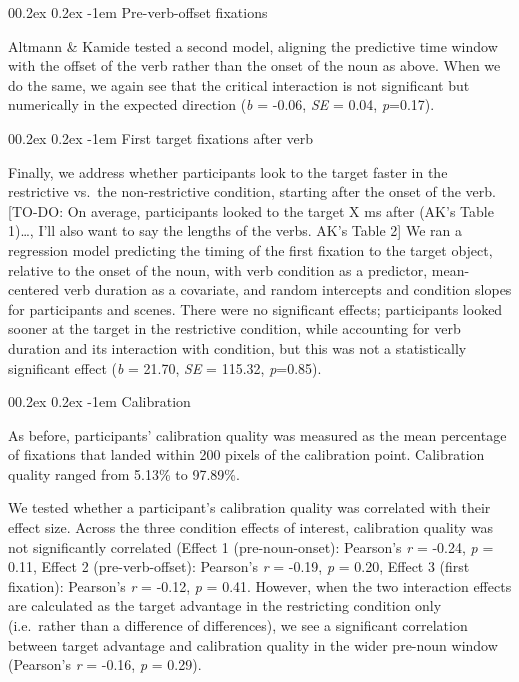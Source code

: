 \documentclass[
  man,floatsintext]{apa6}
\makeatletter
\let\oldparagraph\paragraph
\renewcommand{\paragraph}[1]{\oldparagraph{#1}\mbox{}}
\renewcommand{\paragraph}{\@startsection{paragraph}{4}{\parindent}%
  {0\baselineskip \@plus 0.2ex \@minus 0.2ex}%
  {-1em}%
  {\normalfont\normalsize\bfseries\itshape\typesectitle}}
\makeatother
\begin{document}
\hypertarget{pre-verb-offset-fixations-1}{%
\paragraph{Pre-verb-offset fixations}\label{pre-verb-offset-fixations-1}}

Altmann \& Kamide tested a second model, aligning the predictive time window with the offset of the verb rather than the onset of the noun as above. When we do the same, we again see that the critical interaction is not significant but numerically in the expected direction (\emph{b} = -0.06, \emph{SE} = 0.04, \emph{p}=0.17).

\hypertarget{first-target-fixations-after-verb-1}{%
\paragraph{First target fixations after verb}\label{first-target-fixations-after-verb-1}}

Finally, we address whether participants look to the target faster in the restrictive vs.~the non-restrictive condition, starting after the onset of the verb. {[}TO-DO: On average, participants looked to the target X ms after (AK's Table 1)\ldots, I'll also want to say the lengths of the verbs. AK's Table 2{]} We ran a regression model predicting the timing of the first fixation to the target object, relative to the onset of the noun, with verb condition as a predictor, mean-centered verb duration as a covariate, and random intercepts and condition slopes for participants and scenes. There were no significant effects; participants looked sooner at the target in the restrictive condition, while accounting for verb duration and its interaction with condition, but this was not a statistically significant effect (\emph{b} = 21.70, \emph{SE} = 115.32, \emph{p}=0.85).

\hypertarget{calibration-1}{%
\paragraph{Calibration}\label{calibration-1}}

As before, participants' calibration quality was measured as the mean percentage of fixations that landed within 200 pixels of the calibration point. Calibration quality ranged from 5.13\% to 97.89\%.

We tested whether a participant's calibration quality was correlated with their effect size. Across the three condition effects of interest, calibration quality was not significantly correlated (Effect 1 (pre-noun-onset): Pearson's \emph{r} = -0.24, \emph{p} = 0.11, Effect 2 (pre-verb-offset): Pearson's \emph{r} = -0.19, \emph{p} = 0.20, Effect 3 (first fixation): Pearson's \emph{r} = -0.12, \emph{p} = 0.41. However, when the two interaction effects are calculated as the target advantage in the restricting condition only (i.e.~rather than a difference of differences), we see a significant correlation between target advantage and calibration quality in the wider pre-noun window (Pearson's \emph{r} = -0.16, \emph{p} = 0.29).
\end{document}
